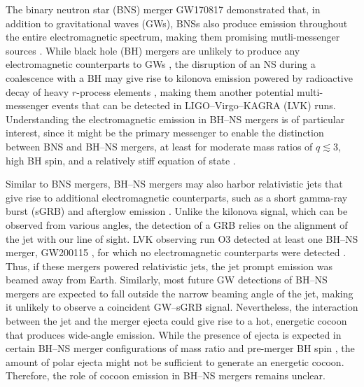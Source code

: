 \documentclass[twocolumn,dvipsnames]{aastex62}
\begin{document}
The binary neutron star (BNS) merger GW170817 demonstrated that, in addition to gravitational waves (GWs), BNSs also produce emission throughout the entire electromagnetic spectrum, making them promising mutli-messenger sources \citep[see][for reviews]{Nakar2019,Margutti2021}. While black hole (BH) mergers are unlikely to produce any electromagnetic counterparts to GWs \citep[see, however,][]{Perna2016}, the disruption of an NS during a coalescence with a BH may give rise to kilonova emission powered by radioactive decay of heavy $r$-process elements \citep[e.g.,][]{Rosswog2005,Surman2008,Metzger2010b,Tanaka2014,Fernandez2015,Fernandez2017,Foucart2015,Kawaguchi2016,Darbha2021,Wanajo2022,Ekanger2023,Gompertz2023}, making them another potential multi-messenger events that can be detected in LIGO--Virgo--KAGRA (LVK) runs.
Understanding the electromagnetic emission in BH--NS mergers is of particular interest, since it might be the primary messenger to enable the distinction between BNS and BH--NS mergers, at least for moderate mass ratios of $ q \lesssim 3 $, high BH spin, and a relatively stiff equation of state \citep[EoS; see e.g.,][]{Tanaka2014,Yang2018,Fragione2021}.

Similar to BNS mergers, BH--NS mergers may also harbor relativistic jets that give rise to additional electromagnetic counterparts, such as a short gamma-ray burst (sGRB) and afterglow emission \citep{Paczynski1991,Mochkovitch1993,Janka1999,Etienne2012,Kiuchi2015,Paschalidis2015,Ruiz2018,Hayashi2022a,Hayashi2022b}. Unlike the kilonova signal, which can be observed from various angles, the detection of a GRB relies on the alignment of the jet with our line of sight. LVK observing run O3 detected at least one BH--NS merger, GW200115 \citep[with GW200105 being an additional controversial source;][]{Abbott2021}, for which no electromagnetic counterparts were detected \citep{Dichiara2021,Zhu2021}. Thus, if these mergers powered relativistic jets, the jet prompt emission was beamed away from Earth. Similarly, most future GW detections of BH--NS mergers are expected to fall outside the narrow beaming angle of the jet, making it unlikely to observe a coincident GW--sGRB signal. Nevertheless, the interaction between the jet and the merger ejecta could give rise to a hot, energetic cocoon that produces wide-angle emission. While the presence of ejecta is expected in certain BH--NS merger configurations of mass ratio and pre-merger BH spin \citep{Shibata2006,Shibata2007,Etienne2008,Rantsiou2008,Shibata2008,Shibata2011,Duez2010,Foucart2011,Foucart2012b,Foucart2014,Foucart2017,Foucart2018,Foucart2019,Kyutoku2011,Kyutoku2013,Kyutoku2015,Kyutoku2018,Foucart2012a,Kawaguchi2015,Brege2018,Hayashi2021,Most2021}, the amount of polar ejecta might not be sufficient to generate an energetic cocoon. Therefore, the role of cocoon emission in BH--NS mergers remains unclear.
\end{document}

